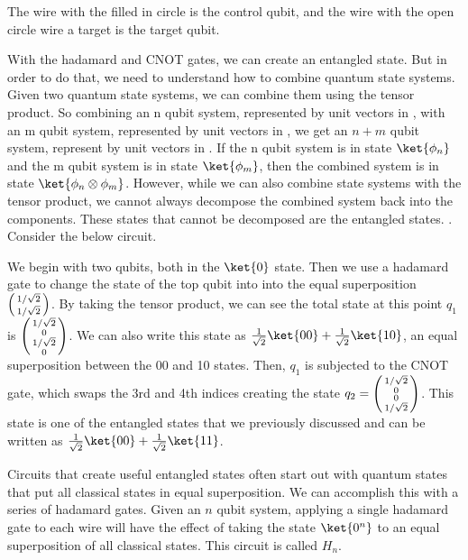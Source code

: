 The wire with the filled in circle is the control qubit, and the wire with the open circle wire a target is the target qubit.

With the hadamard and CNOT gates, we can create an entangled state.
But in order to do that, we need to understand how to combine quantum state systems.
Given two quantum state systems, we can combine them using the tensor product.
So combining an n qubit system, represented by unit vectors in , with an m qubit system, represented by unit vectors in , we get an $n + m$ qubit system, represent by unit vectors in .
If the n qubit system is in state $\ket{\phi_n}$ and the m qubit system is in state $\ket{\phi_m}$, then the combined system is in state $\ket{\phi_n \otimes \phi_m}$.
However, while we can also combine state systems with the tensor product, we cannot always decompose the combined system back into the components.
These states that cannot be decomposed are the entangled states. . Consider the below circuit.



We begin with two qubits, both in the $\ket{0}$ state.
Then we use a hadamard gate to change the state of the top qubit into into the equal superposition $\left(\begin{smallmatrix}1/\sqrt{2} \\ 1/\sqrt{2}\end{smallmatrix}\right)$.
By taking the tensor product, we can see the total state at this point $q_1$ is $\left(\begin{smallmatrix}1/\sqrt{2} \\ 0 \\ 1/\sqrt{2} \\ 0\end{smallmatrix}\right)$.
We can also write this state as $\frac{1}{\sqrt{2}}\ket{00} + \frac{1}{\sqrt{2}}\ket{10}$, an equal superposition between the 00 and 10 states.
Then, $q_1$ is subjected to the CNOT gate, which swaps the 3rd and 4th indices creating the state $q_2 = \left(\begin{smallmatrix}1/\sqrt{2} \\ 0 \\ 0 \\ 1/\sqrt{2}\end{smallmatrix}\right)$.
This state is one of the entangled states that we previously discussed and can be written as  $\frac{1}{\sqrt{2}}\ket{00} + \frac{1}{\sqrt{2}}\ket{11}$.

Circuits that create useful entangled states often start out with quantum states that put all classical states in equal superposition.
We can accomplish this with a series of hadamard gates.
Given an $n$ qubit system, applying a single hadamard gate to each wire will have the effect of taking the state $\ket{0^n}$ to an equal superposition of all classical states.
This circuit is called $H_n$.

